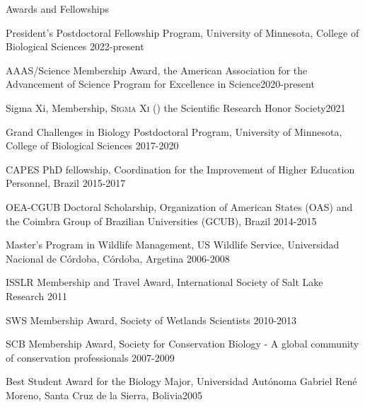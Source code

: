 \documentclass{resume} %
\begin{document}
\begin{rSection}{Awards and Fellowships}

\begin{esSubsection}{President's Postdoctoral Fellowship Program,}{ University of Minnesota, College of Biological Sciences }{2022-present}{}{}
\end{esSubsection}

\begin{esSubsection}{AAAS/Science Membership Award,}{ the American Association for the Advancement of Science Program for Excellence in Science}{2020-present}{}{}
\end{esSubsection}

\begin{esSubsection}{Sigma Xi, Membership,}{ \textsc{Sigma Xi} (\textSigma \textXi) the Scientific Research Honor Society}{2021}{}{}
\end{esSubsection}

\begin{esSubsection}{Grand Challenges in Biology Postdoctoral Program,}{ University of Minnesota, College of Biological Sciences }{2017-2020}{}{}
\end{esSubsection}

\begin{esSubsection}{CAPES PhD fellowship,}{ Coordination for the Improvement of Higher Education Personnel, Brazil }{2015-2017}{}{}
\end{esSubsection}

\begin{esSubsection}{OEA-CGUB Doctoral Scholarship,}{ Organization of American States (OAS) and the Coimbra Group of Brazilian Universities (GCUB), Brazil }{2014-2015}{}{}
\end{esSubsection}

\begin{esSubsection}{Master’s Program in Wildlife Management,}{ US Wildlife Service, Universidad Nacional de Córdoba, Córdoba, Argetina }{2006-2008}{}{}
\end{esSubsection}

\begin{esSubsection}{ISSLR Membership and Travel Award,}{ International Society of Salt Lake Research }{2011}{}{}
\end{esSubsection}

\begin{esSubsection}{SWS Membership Award,}{ Society of Wetlands Scientists }{2010-2013}{}{}
\end{esSubsection}

\begin{esSubsection}{SCB Membership Award,}{ Society for Conservation Biology - A global community of conservation professionals }{2007-2009}{}{}
\end{esSubsection}

\begin{esSubsection}{Best Student Award for the Biology Major,}{ Universidad Autónoma Gabriel René Moreno, Santa Cruz de la Sierra, Bolivia}{2005}{}{}
\end{esSubsection}{}
\end{rSection}
\end{document}
